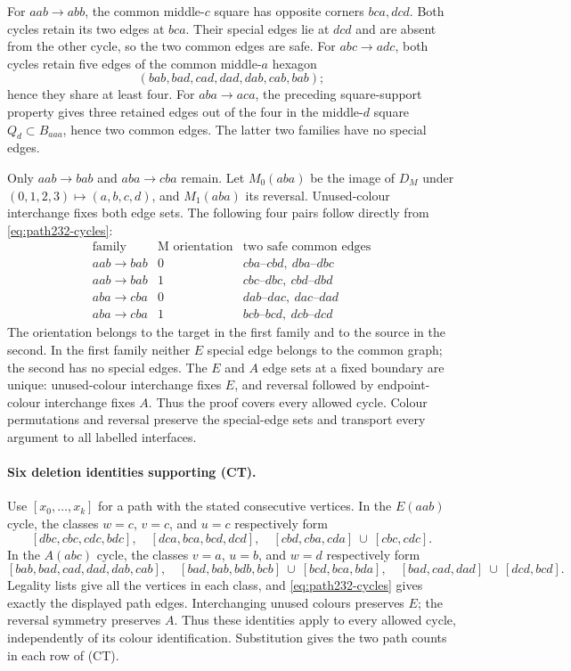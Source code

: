 For $aab\to abb$, the common middle-$c$ square has opposite corners
$bca,dcd$. Both cycles retain its two edges at $bca$. Their special
edges lie at $dcd$ and are absent from the other cycle, so the two
common edges are safe. For $abc\to adc$, both cycles retain five
edges of the common middle-$a$ hexagon
\[
(bab,bad,cad,dad,dab,cab,bab);
\]
hence they share at least four. For $aba\to aca$, the preceding
square-support property gives three retained edges out of the four
in the middle-$d$ square $Q_d\subset B_{aaa}$, hence two common edges.
The latter two families have no special edges.

Only $aab\to bab$ and $aba\to cba$ remain. Let $M_0(aba)$ be the
image of $D_M$ under $(0,1,2,3)\mapsto(a,b,c,d)$, and $M_1(aba)$
its reversal. Unused-colour interchange fixes both edge sets.
The following four pairs follow directly from \eqref{eq:path232-cycles}:
\[
\begin{array}{c|c|l}
\text{family}&\text{M orientation}&\text{two safe common edges}\\\hline
aab\to bab&0&cba\text{--}cbd,\ dba\text{--}dbc\\
aab\to bab&1&cbc\text{--}dbc,\ cbd\text{--}dbd\\
aba\to cba&0&dab\text{--}dac,\ dac\text{--}dad\\
aba\to cba&1&bcb\text{--}bcd,\ dcb\text{--}dcd
\end{array}                                                     \tag{MP}
\]
The orientation belongs to the target in the first family and to the
source in the second. In the first family neither $E$ special edge
belongs to the common graph; the second has no special edges.
The $E$ and $A$ edge sets at a fixed boundary are unique: unused-colour
interchange fixes $E$, and reversal followed by endpoint-colour
interchange fixes $A$. Thus the proof covers every allowed cycle.
Colour permutations and reversal preserve the special-edge sets and
transport every argument to all labelled interfaces.

\paragraph{Six deletion identities supporting (CT).}
Use $[x_0,\ldots,x_k]$ for a path with the stated consecutive vertices.
In the $E(aab)$ cycle, the classes $w=c$, $v=c$, and $u=c$ respectively
form
\[
[dbc,cbc,cdc,bdc],\quad[dca,bca,bcd,dcd],\quad
[cbd,cba,cda]\ \cup\ [cbc,cdc].
\]
In the $A(abc)$ cycle, the classes $v=a$, $u=b$, and $w=d$ respectively
form
\[
[bab,bad,cad,dad,dab,cab],\quad
[bad,bab,bdb,bcb]\ \cup\ [bcd,bca,bda],\quad
[bad,cad,dad]\ \cup\ [dcd,bcd].
\]
Legality lists give all the vertices in each class, and
\eqref{eq:path232-cycles} gives exactly the displayed path edges.
Interchanging unused colours preserves $E$; the reversal symmetry
preserves $A$. Thus these identities apply to every allowed cycle,
independently of its colour identification. Substitution gives the
two path counts in each row of (CT).

